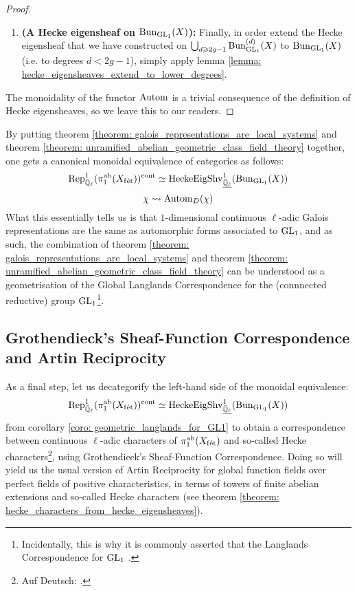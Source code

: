 \begin{proof}
\begin{enumerate}
                        \item \textbf{(A Hecke eigensheaf on $\mathrm{Bun}_{\operatorname{GL}_1}(X)$):} Finally, in order extend the Hecke eigensheaf that we have constructed on $\bigcup_{d \geqslant 2g - 1} \mathrm{Bun}_{\operatorname{GL}_1}^{(d)}(X)$ to $\mathrm{Bun}_{\operatorname{GL}_1}(X)$ (i.e. to degrees $d < 2g - 1$), simply apply lemma \ref{lemma: hecke_eigensheaves_extend_to_lower_degrees}.
                    \end{enumerate}
                The monoidality of the functor $\mathrm{Autom}$ is a trivial consequence of the definition of Hecke eigensheaves, so we leave this to our readers.
            \end{proof}
        
        \begin{corollary} \label{coro: geometric_langlands_for_GL1}
            By putting theorem \ref{theorem: galois_representations_are_local_systems} and theorem \ref{theorem: unramified_abelian_geometric_class_field_theory} together, one gets a canonical monoidal equivalence of categories as follows:
                $$\mathrm{Rep}^1_{\bar{\mathbb{Q}}_{\ell}}(\pi_1^{\mathrm{ab}}(X_{\mathrm{f\acute{e}t}}))^{\mathrm{cont}} \simeq \mathrm{Hecke}\mathrm{Eig}\mathrm{Shv}_{\underline{\bar{\mathbb{Q}}_{\ell}}}^1(\mathrm{Bun}_{\operatorname{GL}_1}(X))$$
                $$\chi \leadsto \mathrm{Autom}_D(\chi)$$
            What this essentially tells us is that $1$-dimensional continuous $\ell$-adic Galois representations are the same as automorphic forms associated to $\operatorname{GL}_1$, and as such, the combination of theorem \ref{theorem: galois_representations_are_local_systems} and theorem \ref{theorem: unramified_abelian_geometric_class_field_theory} can be understood as a geometrisation of the Global Langlands Correspondence for the (connnected reductive) group $\operatorname{GL}_1$\footnote{Incidentally, this is why it is commonly asserted that the Langlands Correspondence for $\operatorname{GL}_1$ .}. 
        \end{corollary}
        
    \subsection{Grothendieck's Sheaf-Function Correspondence and Artin Reciprocity}
        As a final step, let us decategorify the left-hand side of the monoidal equivalence:
            $$\mathrm{Rep}^1_{\bar{\mathbb{Q}}_{\ell}}(\pi_1^{\mathrm{ab}}(X_{\mathrm{f\acute{e}t}}))^{\mathrm{cont}} \simeq \mathrm{Hecke}\mathrm{Eig}\mathrm{Shv}_{\underline{\bar{\mathbb{Q}}_{\ell}}}^1(\mathrm{Bun}_{\operatorname{GL}_1}(X))$$
        from corollary \ref{coro: geometric_langlands_for_GL1} to obtain a correspondence between continuous $\ell$-adic characters of $\pi_1^{\mathrm{ab}}(X_{\mathrm{f\acute{e}t}})$ and so-called Hecke characters\footnote{Auf Deutsch: .}, using Grothendieck's Sheaf-Function Correspondence. Doing so will yield us the usual version of Artin Reciprocity for global function fields over perfect fields of positive characteristics, in terms of towers of finite abelian extensions and so-called Hecke characters (see theorem \ref{theorem: hecke_characters_from_hecke_eigensheaves}).
        
